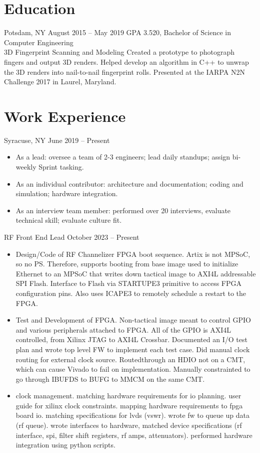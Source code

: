 \documentclass[10pt,final,sans]{resume}
\begin{document}
\section{Education}
 { Potsdam, NY } { August 2015 -- May 2019 }
GPA 3.520, Bachelor of Science in Computer Engineering \\
 { 3D Fingerprint Scanning and Modeling } { }
Created a prototype to photograph fingers and output 3D renders. Helped develop an algorithm in C++ to unwrap the 3D renders into nail-to-nail fingerprint rolls. Presented at the IARPA N2N Challenge 2017 in Laurel, Maryland. \\


\section{Work Experience}
 { Syracuse, NY } { June 2019 -- Present }
\begin{itemize}
  \item As a lead: oversee a team of 2-3 engineers; lead daily standups; assign bi-weekly Sprint tasking. 
  \item As an individual contributor: architecture and documentation; coding and simulation; hardware integration. 
  \item As an interview team member: performed over 20 interviews, evaluate technical skill; evaluate culture fit. 
\end{itemize}

 { RF Front End Lead } { October 2023 -- Present }
\begin{itemize}
  \item Design/Code of RF Channelizer FPGA boot sequence. Artix is not MPSoC, so no PS. Therefore, supports booting from base image used to initialize Ethernet to an MPSoC that writes down tactical image to AXI4L addressable SPI Flash. Interface to Flash via STARTUPE3 primitive to access FPGA configuration pins. Also uses ICAPE3 to remotely schedule a restart to the FPGA. 
  \item Test and Development of FPGA. Non-tactical image meant to control GPIO and various peripherals attached to FPGA. All of the GPIO is AXI4L controlled, from Xilinx JTAG to AXI4L Crossbar. Documented an I/O test plan and wrote top level FW to implement each test case. Did manual clock routing for external clock source. Routedthrough an HDIO not on a CMT, which can cause Vivado to fail on implementation. Manually constrainted to go through IBUFDS to BUFG to MMCM on the same CMT.
  \item clock management. matching hardware requirements for io planning. user guide for xilinx clock constraints. mapping hardware requirements to fpga board io. matching specifications for lvds (vswr). wrote fw to queue up data (rf queue). wrote interfaces to hardware, matched device specifications (rf interface, spi, filter shift registers, rf amps, attenuators). performed hardware integration using python scripts.
\end{itemize}
\end{document}
